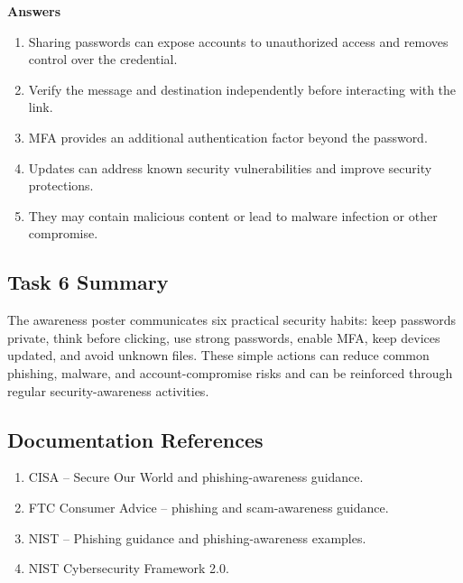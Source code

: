 \documentclass[11pt,a4paper]{article}
\begin{document}
\textbf{Answers}
\begin{enumerate}
    \item Sharing passwords can expose accounts to unauthorized access and removes control over the credential.
    \item Verify the message and destination independently before interacting with the link.
    \item MFA provides an additional authentication factor beyond the password.
    \item Updates can address known security vulnerabilities and improve security protections.
    \item They may contain malicious content or lead to malware infection or other compromise.
\end{enumerate}

\subsection{Task 6 Summary}

The awareness poster communicates six practical security habits: keep passwords private, think before clicking, use strong passwords, enable MFA, keep devices updated, and avoid unknown files. These simple actions can reduce common phishing, malware, and account-compromise risks and can be reinforced through regular security-awareness activities.

\subsection{Documentation References}

\begin{enumerate}
    \item CISA -- Secure Our World and phishing-awareness guidance.
    \item FTC Consumer Advice -- phishing and scam-awareness guidance.
    \item NIST -- Phishing guidance and phishing-awareness examples.
    \item NIST Cybersecurity Framework 2.0.
\end{enumerate}
\end{document}
